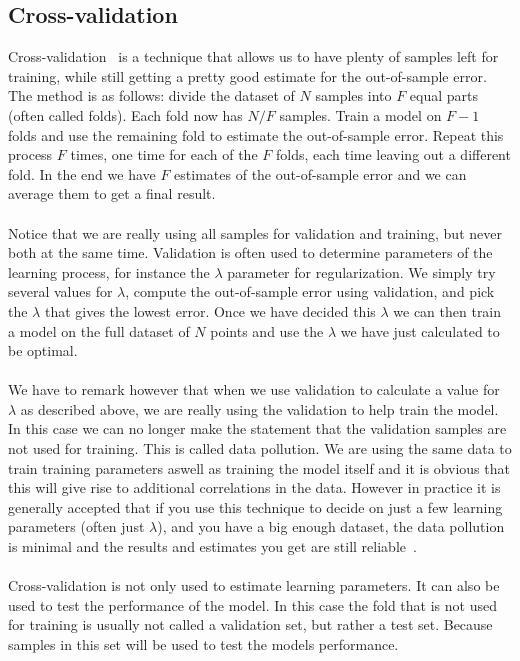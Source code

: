 \subsection{Cross-validation}
Cross-validation~\cite{caltechmachinelearning}\cite{kohavi1995study} is a technique that allows us to have plenty of samples left for training, while still getting a pretty good estimate for the out-of-sample error. The method is as follows: divide the dataset of $N$ samples into $F$ equal parts (often called folds). Each fold now has $N/F$ samples. Train a model on $F-1$ folds and use the remaining fold to estimate the out-of-sample error. Repeat this process $F$ times, one time for each of the $F$ folds, each time leaving out a different fold. In the end we have $F$ estimates of the out-of-sample error and we can average them to get a final result.\\ \\
Notice that we are really using all samples for validation and training, but never both at the same time. Validation is often used to determine parameters of the learning process, for instance the $\lambda$ parameter for regularization. We simply try several values for $\lambda$, compute the out-of-sample error using validation, and pick the $\lambda$ that gives the lowest error. Once we have decided this $\lambda$ we can then train a model on the full dataset of $N$ points and use the $\lambda$ we have just calculated to be optimal. \\ \\
We have to remark however that when we use validation to calculate a value for $\lambda$ as described above, we are really using the validation to help train the model. In this case we can no longer make the statement that the validation samples are not used for training. This is called data pollution. We are using the same data to train training parameters aswell as training the model itself and it is obvious that this will give rise to additional correlations in the data. However in practice it is generally accepted that if you use this technique to decide on just a few learning parameters (often just $\lambda$), and you have a big enough dataset, the data pollution is minimal and the results and estimates you get are still reliable~\cite{caltechmachinelearning}. \\ \\

Cross-validation is not only used to estimate learning parameters. It can also be used to test the performance of the model. In this case the fold that is not used for training is usually not called a validation set, but rather a test set. Because samples in this set will be used to test the models performance. 

